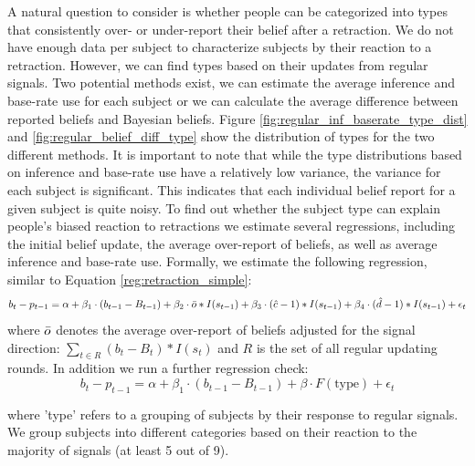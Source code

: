 \documentclass{article}
\begin{document}
A natural question to consider is whether people can be categorized into types that consistently over- or under-report their belief after a retraction. We do not have enough data per subject to characterize subjects by their reaction to a retraction. However, we can find types based on their updates from regular signals. Two potential methods exist, we can estimate the average inference and base-rate use for each subject or we can calculate the average difference between reported beliefs and Bayesian beliefs. Figure \ref{fig:regular_inf_baserate_type_dist} and \ref{fig:regular_belief_diff_type} show the distribution of types for the two different methods. It is important to note that while the type distributions based on inference and base-rate use have a relatively low variance, the variance for each subject is significant. This indicates that each individual belief report for a given subject is quite noisy. To find out whether the subject type can explain people's biased reaction to retractions we estimate several regressions, including the initial belief update, the average over-report of beliefs, as well as average inference and base-rate use. Formally, we estimate the following regression, similar to Equation \ref{reg:retraction_simple}:
\begin{equation*}
    b_t-p_{t-1}=\alpha 
    + \beta_1 \cdot (b_{t-1}-B_{t-1})
    + \beta_2 \cdot \Bar{o}*I(s_{t-1})
    + \beta_3 \cdot (\hat{c}-1)*I(s_{t-1})
    + \beta_4 \cdot (\hat{d}-1)*I(s_{t-1})
    + \epsilon_t
\end{equation*} 
where $\Bar{o}$ denotes the average over-report of beliefs adjusted for the signal direction: $\sum_{t\in R}(b_t-B_t)*I(s_t)$ and $R$ is the set of all regular updating rounds. In addition we run a further regression check:
\begin{equation*}
    b_t-p_{t-1}=\alpha 
    + \beta_1 \cdot (b_{t-1}-B_{t-1})
    + \beta \cdot F(\text{type})
    + \epsilon_t
\end{equation*}

where 'type' refers to a grouping of subjects by their response to regular signals. We group subjects into different categories based on their reaction to the majority of signals (at least 5 out of 9).
\end{document}
